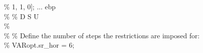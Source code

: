 \hspace{1mm}\hspace{5mm} \hspace{5mm} \hspace{5mm} \hspace{5mm} \hspace{5mm} \hspace{5mm} \hspace{5mm} \hspace{5mm} \textcolor{matlabgreen}{\%          1,       1,      0];       ... ebp }\\ 
\hspace{1mm}\hspace{5mm} \hspace{5mm} \hspace{5mm} \hspace{5mm} \hspace{5mm} \hspace{5mm} \hspace{5mm} \hspace{5mm} \textcolor{matlabgreen}{\%        }\textcolor{matlabgreen}{\% D        S       U    }\\ 
\hspace{1mm}\hspace{5mm} \hspace{5mm} \hspace{5mm} \hspace{5mm} \hspace{5mm} \hspace{5mm} \hspace{5mm} \hspace{5mm} \textcolor{matlabgreen}{\%  }\\ 
\hspace{1mm}\hspace{5mm} \hspace{5mm} \hspace{5mm} \hspace{5mm} \hspace{5mm} \hspace{5mm} \hspace{5mm} \hspace{5mm} \textcolor{matlabgreen}{\% }\textcolor{matlabgreen}{\% Define the number of steps the restrictions are imposed for: }\\ 
\hspace{1mm}\hspace{5mm} \hspace{5mm} \hspace{5mm} \hspace{5mm} \hspace{5mm} \hspace{5mm} \hspace{5mm} \hspace{5mm} \textcolor{matlabgreen}{\% VARopt.sr\_hor = 6; }\\ 
